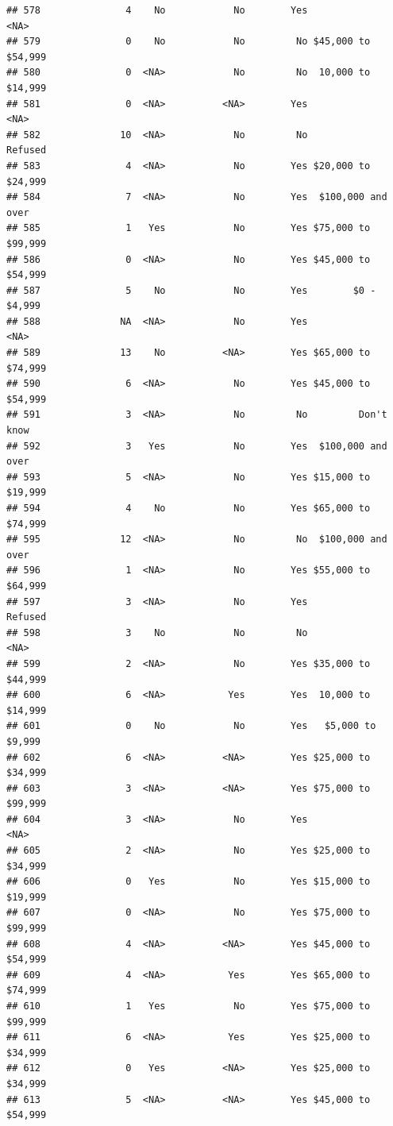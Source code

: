 \documentclass[man]{apa6}
\begin{document}
\begin{verbatim}
## 578               4    No            No        Yes               <NA>
## 579               0    No            No         No $45,000 to $54,999
## 580               0  <NA>            No         No  10,000 to $14,999
## 581               0  <NA>          <NA>        Yes               <NA>
## 582              10  <NA>            No         No            Refused
## 583               4  <NA>            No        Yes $20,000 to $24,999
## 584               7  <NA>            No        Yes  $100,000 and over
## 585               1   Yes            No        Yes $75,000 to $99,999
## 586               0  <NA>            No        Yes $45,000 to $54,999
## 587               5    No            No        Yes        $0 - $4,999
## 588              NA  <NA>            No        Yes               <NA>
## 589              13    No          <NA>        Yes $65,000 to $74,999
## 590               6  <NA>            No        Yes $45,000 to $54,999
## 591               3  <NA>            No         No         Don't know
## 592               3   Yes            No        Yes  $100,000 and over
## 593               5  <NA>            No        Yes $15,000 to $19,999
## 594               4    No            No        Yes $65,000 to $74,999
## 595              12  <NA>            No         No  $100,000 and over
## 596               1  <NA>            No        Yes $55,000 to $64,999
## 597               3  <NA>            No        Yes            Refused
## 598               3    No            No         No               <NA>
## 599               2  <NA>            No        Yes $35,000 to $44,999
## 600               6  <NA>           Yes        Yes  10,000 to $14,999
## 601               0    No            No        Yes   $5,000 to $9,999
## 602               6  <NA>          <NA>        Yes $25,000 to $34,999
## 603               3  <NA>          <NA>        Yes $75,000 to $99,999
## 604               3  <NA>            No        Yes               <NA>
## 605               2  <NA>            No        Yes $25,000 to $34,999
## 606               0   Yes            No        Yes $15,000 to $19,999
## 607               0  <NA>            No        Yes $75,000 to $99,999
## 608               4  <NA>          <NA>        Yes $45,000 to $54,999
## 609               4  <NA>           Yes        Yes $65,000 to $74,999
## 610               1   Yes            No        Yes $75,000 to $99,999
## 611               6  <NA>           Yes        Yes $25,000 to $34,999
## 612               0   Yes          <NA>        Yes $25,000 to $34,999
## 613               5  <NA>          <NA>        Yes $45,000 to $54,999

\end{verbatim}
\end{document}
